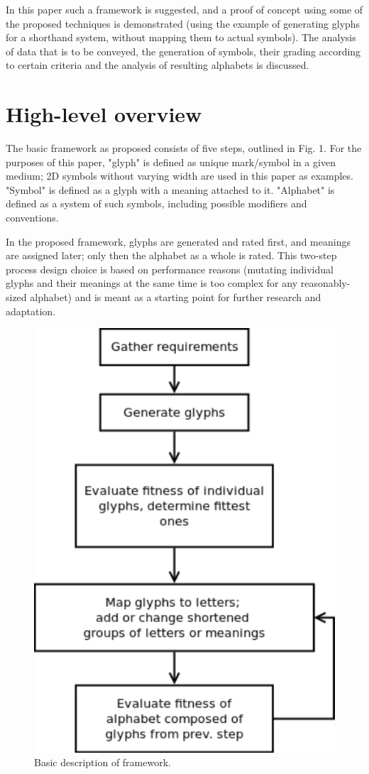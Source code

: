 \documentclass[conference]{IEEEtran}
\begin{document}
In this paper such a framework is suggested, and a proof of concept using some of the proposed techniques is demonstrated (using the example of generating glyphs for a shorthand system, without mapping them to actual symbols). The analysis of data that is to be conveyed, the generation of symbols, their grading according to certain criteria and the analysis of resulting alphabets is discussed.

\section{High-level overview}
The basic framework as proposed consists of five steps, outlined in Fig. 1. For the purposes of this paper, "glyph" is defined as unique mark/symbol in a given medium; 2D symbols without varying width are used in this paper as examples. "Symbol" is defined as a glyph with a meaning attached to it. "Alphabet" is defined as a system of such symbols, including possible modifiers and conventions.

In the proposed framework, glyphs are generated and rated first, and meanings are assigned later; only then the alphabet as a whole is rated. This two-step process design choice is based on performance reasons (mutating individual glyphs and their meanings at the same time is too complex for any reasonably-sized alphabet) and is meant as a starting point for further research and adaptation. 

\begin{figure}[tbp]
\centering
        \includegraphics[width=0.75\hsize]{f.pdf}
\caption{Basic description of framework.}
\end{figure}
\end{document}
